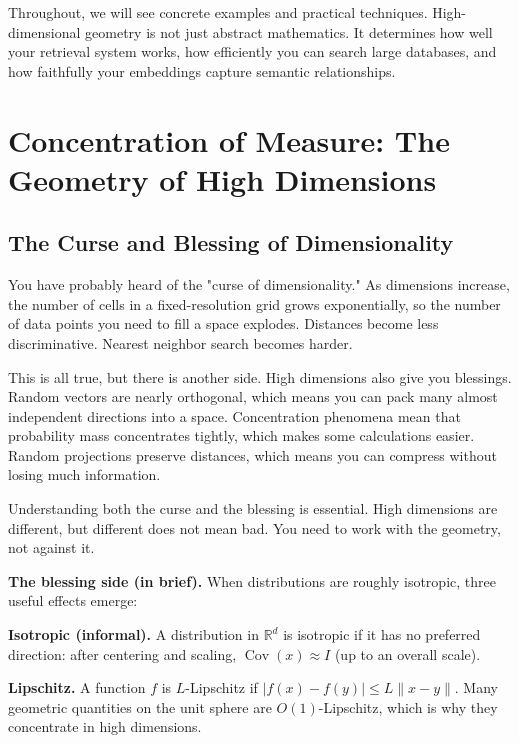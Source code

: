 Throughout, we will see concrete examples and practical techniques. High-dimensional geometry is not just abstract mathematics. It determines how well your retrieval system works, how efficiently you can search large databases, and how faithfully your embeddings capture semantic relationships.

\vspace{2em}

\section{Concentration of Measure: The Geometry of High Dimensions}

\subsection{The Curse and Blessing of Dimensionality}

You have probably heard of the "curse of dimensionality." As dimensions increase, the number of cells in a fixed-resolution grid grows exponentially, so the number of data points you need to fill a space explodes. Distances become less discriminative. Nearest neighbor search becomes harder.

This is all true, but there is another side. High dimensions also give you blessings. Random vectors are nearly orthogonal, which means you can pack many almost independent directions into a space. Concentration phenomena mean that probability mass concentrates tightly, which makes some calculations easier. Random projections preserve distances, which means you can compress without losing much information.

\vspace{1em}

Understanding both the curse and the blessing is essential. High dimensions are different, but different does not mean bad. You need to work with the geometry, not against it.

\vspace{0.5em}

\textbf{The blessing side (in brief).} When distributions are roughly isotropic, three useful effects emerge:

\begin{notationbox}
\textbf{Isotropic (informal).} A distribution in $\mathbb{R}^d$ is isotropic if it has no preferred direction: after centering and scaling, $\operatorname{Cov}(x) \approx I$ (up to an overall scale).

\textbf{Lipschitz.} A function $f$ is $L$-Lipschitz if $|f(x) - f(y)| \le L\|x-y\|$. Many geometric quantities on the unit sphere are $O(1)$-Lipschitz, which is why they concentrate in high dimensions.
\end{notationbox}

